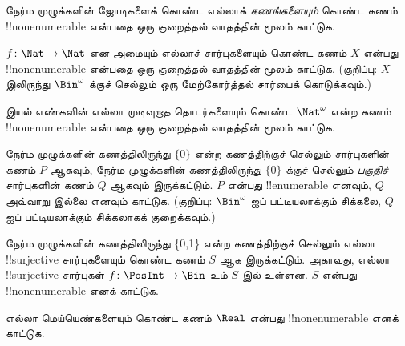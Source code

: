 \documentclass[../../../include/open-logic-section]{subfiles}
\begin{document}
\begin{prob}
நேர்ம முழுக்களின் ஜோடிகளைக் கொண்ட எல்லாக்
\emph{கணங்களையும்} கொண்ட கணம் !!{nonenumerable} என்பதை
ஒரு குறைத்தல் வாதத்தின் மூலம் காட்டுக.
\end{prob}

\begin{prob}\label{sfr:siz:red:prob:nat-nat}
$f\colon \Nat \to \Nat$ என அமையும் எல்லாச் சார்புகளையும் கொண்ட
கணம் $X$ என்பது !!{nonenumerable} என்பதை ஒரு குறைத்தல் வாதத்தின்
மூலம் காட்டுக.
(குறிப்பு: $X$ இலிருந்து $\Bin^\omega$ க்குச் செல்லும்
ஒரு மேற்கோர்த்தல் சார்பைக் கொடுக்கவும்.)
\end{prob}

\begin{prob}
இயல் எண்களின் எல்லா முடிவுறாத தொடர்களையும் கொண்ட
$\Nat^\omega$ என்ற கணம் !!{nonenumerable} என்பதை
ஒரு குறைத்தல் வாதத்தின் மூலம் காட்டுக.
\end{prob}

\begin{prob}
நேர்ம முழுக்களின் கணத்திலிருந்து $\{0\}$ என்ற கணத்திற்குச் செல்லும்
சார்புகளின் கணம் $P$ ஆகவும்,
நேர்ம முழுக்களின் கணத்திலிருந்து $\{0\}$ க்குச் செல்லும்
\emph{பகுதிச்} சார்புகளின் கணம் $Q$ ஆகவும் இருக்கட்டும்.
$P$ என்பது !!{enumerable} எனவும், $Q$ அவ்வாறு இல்லை எனவும் காட்டுக.
(குறிப்பு: $\Bin^\omega$ ஐப் பட்டியலாக்கும் சிக்கலை,
$Q$ ஐப் பட்டியலாக்கும் சிக்கலாகக் குறைக்கவும்.)
\end{prob}

\begin{prob}
நேர்ம முழுக்களின் கணத்திலிருந்து \{0,1\} என்ற கணத்திற்குச் செல்லும்
எல்லா !!{surjective} சார்புகளையும் கொண்ட கணம் $S$ ஆக இருக்கட்டும்.
அதாவது, எல்லா !!{surjective} சார்புகள்
$f\colon \PosInt \to \Bin$ உம் $S$ இல் உள்ளன.
$S$ என்பது !!{nonenumerable} எனக் காட்டுக.
\end{prob}

\begin{prob}
எல்லா மெய்யெண்களையும் கொண்ட கணம் $\Real$ என்பது
!!{nonenumerable} எனக் காட்டுக.
\end{prob}
\end{document}
